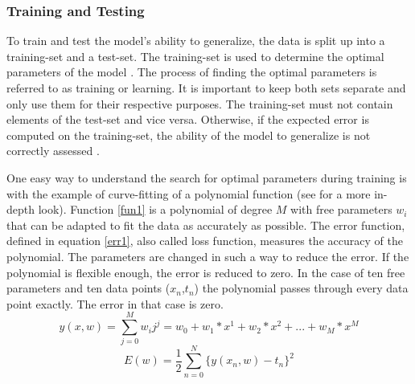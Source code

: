 \subsubsection*{Training and Testing}\label{TT}
To train and test the model's ability to generalize, the data is split up into a training-set and a test-set. The training-set is used to determine the optimal parameters of the model \cite{Bishop}. The process of finding the optimal parameters is referred to as training or learning. It is important to keep both sets separate and only use them for their respective purposes. The training-set must not contain elements of the test-set and vice versa. Otherwise, if the expected error is computed on the training-set, the ability of the model to generalize is not correctly assessed \cite{Xiaogang}.

One easy way to understand the search for optimal parameters during training is with the example of curve-fitting of a polynomial function (see \cite{Bishop} for a more in-depth look). \newline
Function \ref{fun1} is a polynomial of degree \(M\) with free parameters \(w_i\) that can be adapted to fit the data as accurately as possible.
The error function, defined in equation \ref{err1}, also called loss function, measures the accuracy of the polynomial. The parameters are changed in such a way to reduce the error. If the polynomial is flexible enough, the error is reduced to zero. In the case of ten free parameters and ten data points (\(x_n\),\(t_n\)) the polynomial passes through every data point exactly. The error in that case is zero. 
\begin{equation}\label{fun1}
	y(x,w) = \sum_{j=0}^{M}w_ij^j= w_0+w_1*x^1+w_2*x^2+...+w_M*x^M
\end{equation}
\begin{equation}\label{err1}
	E(w) = \frac{1}{2}\sum_{n=0}^{N}\{y(x_n,w)-t_n\}^2
\end{equation}

